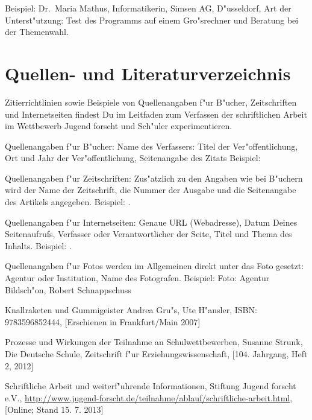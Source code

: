 \documentclass[10pt,twoside]{article}  %
\begin{document}
    Beispiel: Dr.\ Maria Mathus, Informatikerin, Simsen AG, D"usseldorf, Art der
    Unterst"utzung: Test des Programms auf einem Gro"srechner und Beratung bei
    der Themenwahl.

  \section{Quellen- und Literaturverzeichnis}
    Zitierrichtlinien sowie Beispiele von Quellenangaben f"ur B"ucher,
    Zeitschriften und Internetseiten findest Du im \glqq{}Leitfaden zum
    Verfassen der schriftlichen Arbeit im Wettbewerb Jugend forscht und Sch"uler
    experimentieren\grqq{}\cite{JuFoFaden}.

    Quellenangaben f"ur B"ucher:
    Name des Verfassers: Titel der Ver"offentlichung, Ort und Jahr der
    Ver"offentlichung, Seitenangabe des Zitats Beispiel: \cite[S.\,10]{Rakete}

    Quellenangaben f"ur Zeitschriften:
    Zus"atzlich zu den Angaben wie bei B"uchern wird der Name der Zeitschrift,
    die Nummer der Ausgabe und die Seitenangabe des Artikels angegeben.
    Beispiel: \cite[S.\,150ff.]{SchulWett}.

    Quellenangaben f"ur Internetseiten:
    Genaue URL (Webadresse), Datum Deines Seitenaufrufs, Verfasser oder
    Verantwortlicher der Seite, Titel und Thema des Inhalts. Beispiel:
    \cite{JuFoFaden}.

    Quellenangaben f"ur Fotos werden im Allgemeinen direkt unter das Foto gesetzt:
    Agentur oder Institution, Name des Fotografen.
    Beispiel: Foto: Agentur Bildsch"on, Robert Schnappschuss

    \begin{thebibliography}{9}
       Knallraketen und Gummigeister
                       Andrea Gru"s, Ute H"ansler,
                       ISBN: 9783596852444,
                       [Erschienen in Frankfurt/Main 2007]

       Prozesse und Wirkungen der Teilnahme an Schulwettbewerben,
                          Susanne Strunk,
                          Die Deutsche Schule, Zeitschrift f"ur Erziehungswissenschaft,
                          [104. Jahrgang, Heft 2, 2012]

       Schriftliche Arbeit und weiterf"uhrende Informationen,
                          Stiftung Jugend forscht e.V.,
                          \url{http://www.jugend-forscht.de/teilnahme/ablauf/schriftliche-arbeit.html},
                          [Online; Stand 15. 7. 2013]
    \end{thebibliography}
\end{document}
